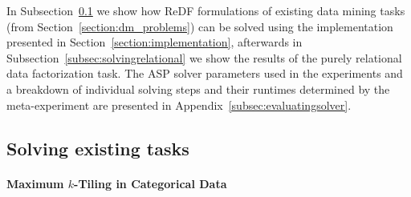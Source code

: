 In Subsection~\ref{subsec:solvingexisting} we show how ReDF formulations of existing data mining tasks (from Section~\ref{section:dm_problems}) can be solved using the implementation presented in Section~\ref{section:implementation}, afterwards in Subsection~\ref{subsec:solvingrelational} we show the results of the purely relational data factorization task. The ASP solver parameters used in the experiments and a breakdown of individual solving steps and their runtimes determined by the meta-experiment are presented in Appendix~\ref{subsec:evaluatingsolver}.

\subsection{Solving existing tasks}
\label{subsec:solvingexisting}
\paragraph{Maximum $k$-Tiling in Categorical Data}
